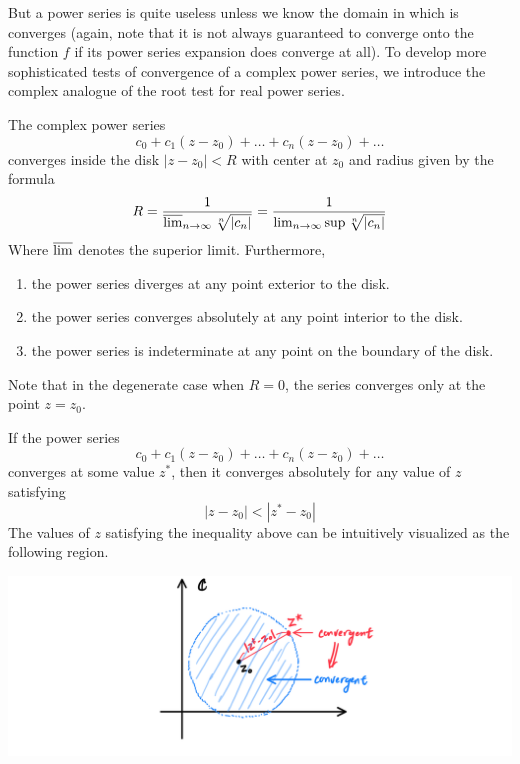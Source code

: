     But a power series is quite useless unless we know the domain in which is converges (again, note that it is not always guaranteed to converge onto the function $f$ if its power series expansion does converge at all). To develop more sophisticated tests of convergence of a complex power series, we introduce the complex analogue of the root test for real power series. 

    \begin{theorem}
    The complex power series 
    \[c_0 + c_1 (z - z_0) + \ldots + c_n (z - z_0) + \ldots\]
    converges inside the disk $|z - z_0| < R$ with center at $z_0$ and radius given by the formula
    \[R = \frac{1}{\varlimsup_{n \rightarrow \infty} \sqrt[n]{|c_n|}} = \frac{1}{\lim_{n \rightarrow \infty} \sup{\sqrt[n]{|c_n|}}}\]
    Where $\varlimsup$ denotes the superior limit. Furthermore, 
    \begin{enumerate}
      \item the power series diverges at any point exterior to the disk. 
      \item the power series converges absolutely at any point interior to the disk. 
      \item the power series is indeterminate at any point on the boundary of the disk. 
    \end{enumerate}
    Note that in the degenerate case when $R = 0$, the series converges only at the point $z = z_0$. 
    \end{theorem}

    \begin{corollary}
    If the power series 
    \[c_0 + c_1 (z - z_0) + \ldots + c_n (z - z_0) + \ldots\]
    converges at some value $z^*$, then it converges absolutely for any value of $z$ satisfying
    \[|z - z_0| < |z^* - z_0|\]
    The values of $z$ satisfying the inequality above can be intuitively visualized as the following region. 
    \begin{center}
        \includegraphics[scale=0.25]{img/Abels_First_Theorem.PNG}
    \end{center}
    \end{corollary}

